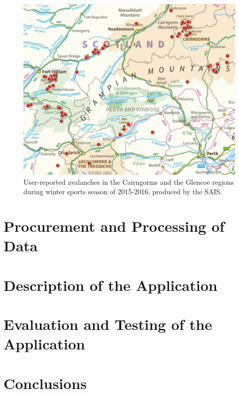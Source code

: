 \documentclass[openany]{UoYCSproject}
\begin{document}
\begin{figure}[h]
		\centering
		\includegraphics[scale=0.4]{ScotAvalanches1516.png}
		\caption{\label{fig:scotava1516} User-reported avalanches in the Cairngorms and the Glencoe regions during winter sports season of 2015-2016, produced by the SAIS.\cite{sais-map}}
\end{figure}


\chapter{Procurement and Processing of Data} \label{ch:data}

\chapter{Description of the Application} \label{ch:app-description}

\chapter{Evaluation and Testing of the Application} \label{ch:app-testing}

\chapter{Conclusions} \label{ch:conclusions}

\small{}
\end{document}
